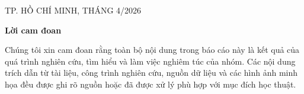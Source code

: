 \documentclass[12pt, a4paper]{article}
\theoremstyle{definition}
\begin{document}
\begin{titlepage}
\vspace{0.5cm}

\begin{center}
\fontsize{15}{12}
\end{center}

\vspace{1.5cm}

\begin{center}
    \fontsize{15}{12}\selectfont TP. HỒ CHÍ MINH, THÁNG 4/2026
\end{center}
\end{titlepage}







\newpage
\begin{center}
    \textbf{\Large Lời cam đoan}
\end{center}
\quad
Chúng tôi xin cam đoan rằng toàn bộ nội dung trong báo cáo này là kết quả của quá trình nghiên cứu, tìm hiểu và làm việc nghiêm túc của nhóm. Các nội dung trích dẫn từ tài liệu, công trình nghiên cứu, nguồn dữ liệu và các hình ảnh minh họa đều được ghi rõ nguồn hoặc đã được xử lý phù hợp với mục đích học thuật.
\end{document}
